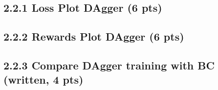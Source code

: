 \documentclass[12pt]{article}
\begin{document}
\subsection*{2.2.1 Loss Plot DAgger (6 pts)}
\begin{tcolorbox}[fit,height=20em, width=40em, blank, borderline={1pt}{1pt},nobeforeafter]
            \begin{center}
            \begin{solution}                    
            
                        \end{solution}
            \end{center}
            \end{tcolorbox}
           
            
\subsection*{2.2.2 Rewards Plot DAgger (6 pts)}

\begin{tcolorbox}[fit,height=24em, width=40em, blank, borderline={1pt}{1pt},nobeforeafter]
            \begin{center}
            \begin{solution}

            \end{solution}
\end{center}
\end{tcolorbox}




\subsection*{2.2.3 Compare DAgger training with BC (written, 4 pts)}
\begin{tcolorbox}[fit,height=10em, width=40em, blank, borderline={1pt}{1pt},nobeforeafter]
            \begin{center}
            \begin{solution}

            \end{solution}
            \end{center}
            \end{tcolorbox}
\end{document}
